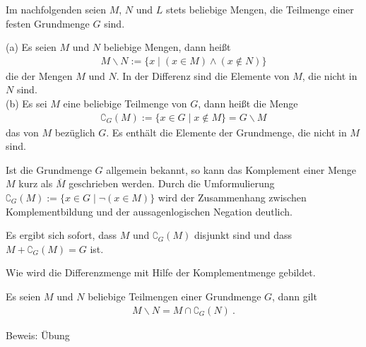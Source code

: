 
\begin{Unit}
Im nachfolgenden seien $M$, $N$ und $L$ stets beliebige Mengen, die Teilmenge
einer festen Grundmenge $G$ sind.

\begin{Definition}
  (a) Es seien $M$ und $N$ beliebige Mengen, dann heißt
    \begin{align}
      M \backslash N := \{ x \mid (x \in M) \land (x \notin N) \} 
    \end{align}
    die  der Mengen $M$ und $N$. In der Differenz sind
    die Elemente von $M$, die nicht in $N$ sind. \\
  (b) Es sei $M$ eine beliebige Teilmenge von $G$, dann heißt die Menge
    \begin{align}
      \complement_G(M) := \{ x \in G \mid x \notin M \} = G \backslash  M
    \end{align}
    das  von $M$ bezüglich $G$. Es enthält die Elemente 
    der Grundmenge, die nicht in $M$ sind.
\end{Definition}

Ist die Grundmenge $G$ allgemein bekannt, so kann das Komplement einer Menge 
$M$ kurz als $\overline{M}$ geschrieben werden. Durch die Umformulierung 
$\complement_G(M) := \{ x \in G \mid \neg(x \in M) \}$ wird der Zusammenhang 
zwischen Komplementbildung und der aussagenlogischen Negation deutlich.

Es ergibt sich sofort, dass $M$ und $\complement_G(M)$ disjunkt sind und dass 
$M + \complement_G(M) = G$ ist.
\end{Unit}

\begin{Unit}[Bemerkung]
Wie wird die Differenzmenge mit Hilfe der Komplementmenge gebildet.

\begin{Bemerkung} 
  Es seien $M$ und $N$ beliebige Teilmengen einer Grundmenge $G$, dann gilt
  \begin{align}
    M \backslash N = M \cap \complement_G(N) \ .
  \end{align}
\end{Bemerkung}
Beweis: Übung
\end{Unit}

